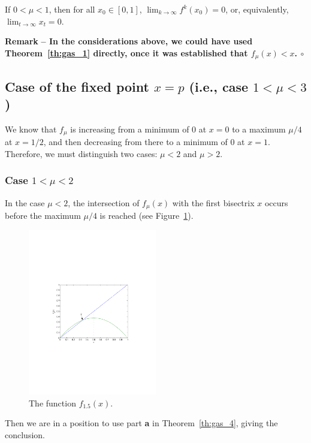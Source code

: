 \documentclass[12pt]{article}
\theoremstyle{plain}
\newenvironment{remark}{\vskip0.2cm\par\noindent\begin{small}\bf Remark\,\,\rm --}{\hfill{$\circ$}\end{small}\par\vskip0.25cm}
\begin{document}
 If $0<\mu<1$, then for all $x_0\in[0,1]$, $\lim_{k\to\infty}f^k(x_0)=0$, or, equivalently, $\lim_{t\to\infty}x_t=0$.

\begin{remark}
In the considerations above, we could have used Theorem~\ref{th:gas_1} directly, once it was established that $f_\mu(x)<x$.
\end{remark}
 

\subsection{Case of the fixed point $x=p$ (i.e., case $1<\mu<3$)}
We know that $f_\mu$ is increasing from a minimum of 0 at $x=0$ to a maximum $\mu/4$ at $x=1/2$, and then decreasing from there to a minimum of 0 at $x=1$. Therefore, we must distinguish two cases: $\mu<2$ and $\mu>2$.


\subsubsection{Case $1<\mu<2$}
In the case $\mu<2$, the intersection of $f_\mu(x)$ with the first bisectrix $x$ occurs before the maximum $\mu/4$ is reached (see Figure~\ref{fig:logistic_1dot5}).
\begin{figure}[htbp]
\begin{center}
\includegraphics[width=0.5\textwidth]{logistic_1dot5}
\end{center}
\caption{The function $f_{1.5}(x)$.}\label{fig:logistic_1dot5}
\end{figure}
Then we are in a position to use part {\bf a} in Theorem~\ref{th:gas_4}, giving the conclusion.
\end{document}
